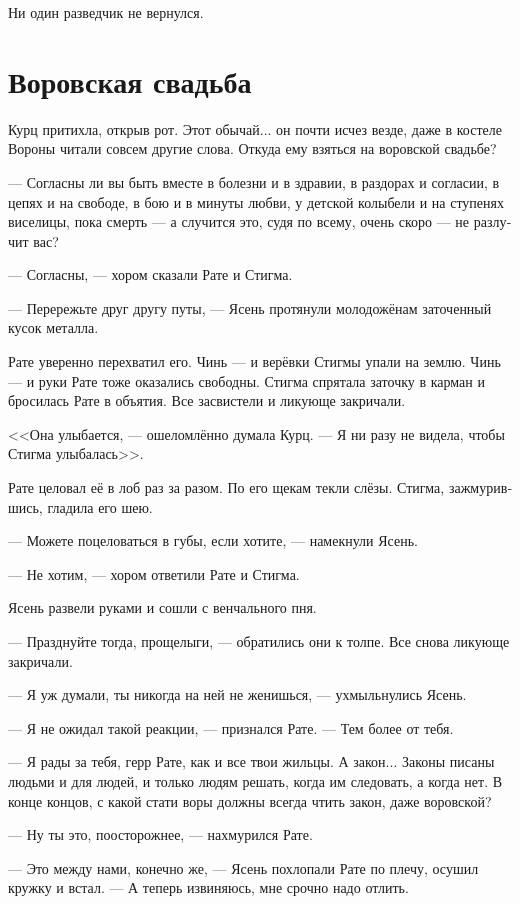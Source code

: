 \documentclass[a4paper,12pt,fleqn]{book}\usepackage{polyglossia}\setdefaultlanguage[babelshorthands=true]{russian}\setotherlanguage{english}\defaultfontfeatures{Ligatures=TeX,Mapping=tex-text}\usepackage{xcolor}\newcommand{\ml}[3]{#2}
\newcommand{\asterism}{\vspace{1em}{\centering\Large\bfseries$\ast~\ast~\ast$\par}\vspace{1em}}
\begin{document}
Ни один разведчик не вернулся.

\section{Воровская свадьба}

Курц притихла, открыв рот.
Этот обычай... он почти исчез везде, даже в костеле Вороны читали совсем другие слова.
Откуда ему взяться на воровской свадьбе?

--- Согласны ли вы быть вместе в болезни и в здравии, в раздорах и согласии, в цепях и на свободе, в бою и в минуты любви, у детской колыбели и на ступенях виселицы, пока смерть --- а случится это, судя по всему, очень скоро --- не разлучит вас?

--- Согласны, --- хором сказали Рате и Стигма.

--- Перережьте друг другу путы, --- Ясень протянули молодожёнам заточенный кусок металла.

Рате уверенно перехватил его.
Чинь --- и верёвки Стигмы упали на землю.
Чинь --- и руки Рате тоже оказались свободны.
Стигма спрятала заточку в карман и бросилась Рате в объятия.
Все засвистели и ликующе закричали.

<<Она улыбается, --- ошеломлённо думала Курц.
--- Я ни разу не видела, чтобы Стигма улыбалась>>.

Рате целовал её в лоб раз за разом.
По его щекам текли слёзы.
Стигма, зажмурившись, гладила его шею.

--- Можете поцеловаться в губы, если хотите, --- намекнули Ясень.

--- Не хотим, --- хором ответили Рате и Стигма.

Ясень развели руками и сошли с венчального пня.

--- Празднуйте тогда, прощелыги, --- обратились они к толпе.
Все снова ликующе закричали.

\asterism

--- Я уж думали, ты никогда на ней не женишься, --- ухмыльнулись Ясень.

--- Я не ожидал такой реакции, --- признался Рате.
--- Тем более от тебя.

--- Я рады за тебя, герр Рате, как и все твои жильцы.
А закон...
Законы писаны людьми и для людей, и только людям решать, когда им следовать, а когда нет.
В конце концов, с какой стати воры должны всегда чтить закон, даже воровской?

--- Ну ты это, поосторожнее, --- нахмурился Рате.

--- Это между нами, конечно же, --- Ясень похлопали Рате по плечу, осушил кружку и встал.
--- А теперь извиняюсь, мне срочно надо отлить.
\end{document}
